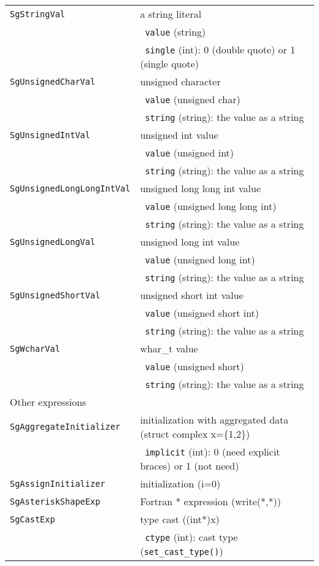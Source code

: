 \begin{longtable}[l]{l|p{10cm}}
 \texttt{SgStringVal}& a string literal\\
 & ~\texttt{value} (string) \\
 & ~\texttt{single} (int): 0 (double quote) or 1 (single quote)\\
 \texttt{SgUnsignedCharVal}& unsigned character\\
 & ~\texttt{value} (unsigned char) \\
 & ~\texttt{string} (string): the value as a string \\
 \texttt{SgUnsignedIntVal}& unsigned int value\\
 & ~\texttt{value} (unsigned int) \\
 & ~\texttt{string} (string): the value as a string \\
 \texttt{SgUnsignedLongLongIntVal}& unsigned long long int value\\
 & ~\texttt{value} (unsigned long long int) \\
 & ~\texttt{string} (string): the value as a string \\
 \texttt{SgUnsignedLongVal}& unsigned long int value\\
 & ~\texttt{value} (unsigned long int) \\
 & ~\texttt{string} (string): the value as a string \\
 \texttt{SgUnsignedShortVal}& unsigned short int value\\
 & ~\texttt{value} (unsigned short int) \\
 & ~\texttt{string} (string): the value as a string \\
 \texttt{SgWcharVal}& whar\_t value\\
 & ~\texttt{value} (unsigned short) \\
 & ~\texttt{string} (string): the value as a string \\
 \hline
 \multicolumn{2}{l}{Other expressions}\\
 \hline
 \texttt{SgAggregateInitializer} & initialization with aggregated data (struct complex x=\{1,2\}) \\
 & ~\texttt{implicit} (int): 0 (need explicit braces) or 1 (not need)\\
 \texttt{SgAssignInitializer} & initialization (i=0)\\
 \texttt{SgAsteriskShapeExp} & Fortran * expression (write(*,*))\\
 \texttt{SgCastExp} & type cast ((int*)x)\\
 & ~\texttt{ctype} (int): cast type (\texttt{set\_cast\_type()}) \\

\end{longtable}
